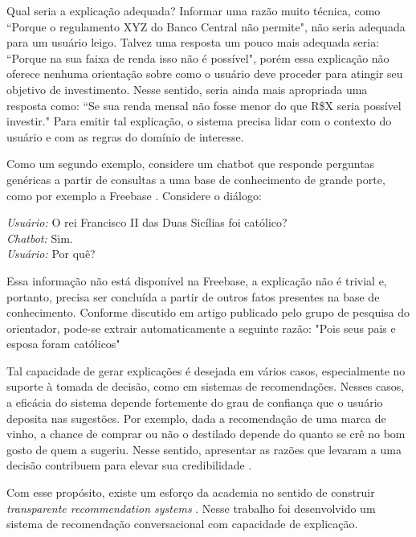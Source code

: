 \documentclass[]{politex}
\begin{document}
Qual seria a explicação adequada? Informar uma razão muito técnica, como ``Porque o regulamento XYZ do Banco Central não permite", não seria adequada para um usuário leigo. Talvez uma resposta um pouco mais adequada seria: ``Porque na sua faixa de renda isso não é possível", porém essa explicação não oferece nenhuma orientação sobre como o usuário deve proceder para atingir seu objetivo de investimento. Nesse sentido, seria ainda mais apropriada uma resposta como: ``Se sua renda mensal não fosse menor do que R\$X seria possível investir." Para emitir tal explicação, o sistema precisa lidar com o contexto do usuário e com as regras do domínio de interesse.

Como um segundo exemplo, considere um chatbot que responde perguntas genéricas a partir de consultas a uma base de conhecimento de grande porte, como por exemplo a Freebase \cite{Bollacker:2008:FCC:1376616.1376746}. Considere o diálogo:

\begin{flushleft}
    \textit{Usuário:} O rei Francisco II das Duas Sicílias foi católico? \\
    \textit{Chatbot:} Sim. \\
    \textit{Usuário:} Por quê?
\end{flushleft}

Essa informação não está disponível na Freebase, a explicação não é trivial e, portanto, precisa ser concluída a partir de outros fatos presentes na base de conhecimento. Conforme discutido em artigo publicado pelo grupo de pesquisa do orientador, pode-se extrair automaticamente a seguinte razão: "Pois seus pais e esposa foram católicos" \cite{DBLP:journals/corr/abs-1806-09504}

Tal capacidade de gerar explicações é desejada em vários casos, especialmente no suporte à tomada de decisão, como em sistemas de recomendações. Nesses casos, a eficácia do sistema depende fortemente do grau de confiança que o usuário deposita nas sugestões. Por exemplo, dada a recomendação de uma marca de vinho, a chance de comprar ou não o destilado depende do quanto se crê no bom gosto de quem a sugeriu. Nesse sentido, apresentar as razões que levaram a uma decisão contribuem para elevar sua credibilidade \cite{molnar2019}.

Com esse propósito, existe um esforço da academia no sentido de construir \textit{transparente recommendation systems} \cite{Musto-et-al}. Nesse trabalho foi desenvolvido um sistema de recomendação conversacional com capacidade de explicação. 
\end{document}
